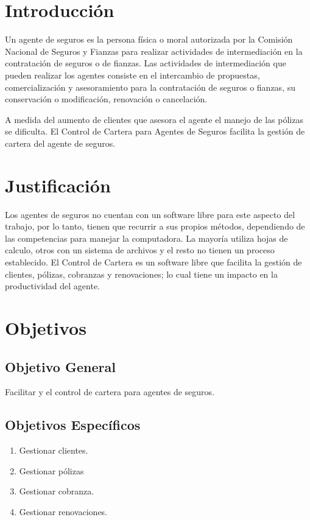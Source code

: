 \setcounter{page}{1}

\section*{Introducción}%
Un agente de seguros es la persona física o moral autorizada por la Comisión Nacional de Seguros y Fianzas para realizar actividades de intermediación en la contratación de seguros o de fianzas. Las actividades de intermediación que pueden realizar los agentes consiste en el intercambio de propuestas, comercialización y asesoramiento para la contratación de seguros o fianzas, su conservación o modificación, renovación o cancelación. \cite{www:reg-agentes}

A medida del aumento de clientes que asesora el agente el manejo de las pólizas se dificulta.
El Control de Cartera para Agentes de Seguros facilita la gestión de cartera del agente de seguros.

\section*{Justificación}

Los agentes de seguros no cuentan con un software libre para este aspecto del trabajo, por lo tanto, tienen que recurrir a sus propios métodos, dependiendo de las competencias para manejar la computadora. La mayoría utiliza hojas de calculo, otros con un sistema de archivos y el resto no tienen 
un proceso establecido.
El Control de Cartera es un software libre que facilita la gestión de clientes, pólizas, cobranzas y renovaciones; lo cual tiene un impacto en la productividad del agente.

\section*{Objetivos}

\subsection*{Objetivo General}
Facilitar y el control de cartera para agentes de seguros.

\subsection*{Objetivos Específicos}
\begin{enumerate}
  \item Gestionar clientes. 
  \item Gestionar pólizas
  \item Gestionar cobranza.
  \item Gestionar renovaciones.
\end{enumerate}

